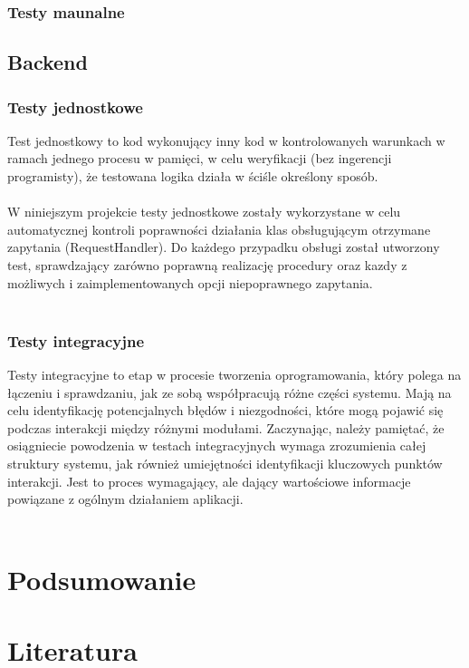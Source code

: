 \documentclass[12pt,a4paper]{article}
\begin{document}
\subsubsection{Testy maunalne}

\newpage
\subsection{Backend}
\subsubsection{Testy jednostkowe}
Test jednostkowy to kod wykonujący inny kod w kontrolowanych warunkach w ramach jednego procesu w pamięci, w celu weryfikacji (bez ingerencji programisty), że testowana logika działa w ściśle określony sposób.
\\\\
W niniejszym projekcie testy jednostkowe zostały wykorzystane w celu automatycznej kontroli poprawności działania klas obsługującym otrzymane zapytania (RequestHandler). Do każdego przypadku obsługi został utworzony test, sprawdzający zarówno poprawną realizację procedury oraz kazdy z możliwych i zaimplementowanych opcji niepoprawnego zapytania.
\\\\


\subsubsection{Testy integracyjne}
Testy integracyjne to etap w procesie tworzenia oprogramowania, który polega na łączeniu i sprawdzaniu, jak ze sobą współpracują różne części systemu. Mają na celu identyfikację potencjalnych błędów i niezgodności, które mogą pojawić się podczas interakcji między różnymi modułami. Zaczynając, należy pamiętać, że osiągniecie powodzenia w testach integracyjnych wymaga zrozumienia całej struktury systemu, jak również umiejętności identyfikacji kluczowych punktów interakcji. Jest to proces wymagający, ale dający wartościowe informacje powiązane z ogólnym działaniem aplikacji.
\\\\


\newpage
\section{Podsumowanie}

\newpage
\section{Literatura}
\end{document}
